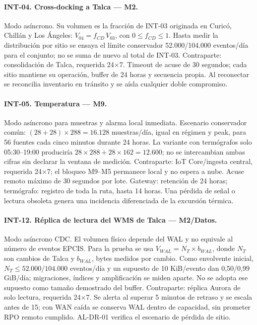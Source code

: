 \paragraph{INT-04. Cross-docking a Talca --- M2.}
Modo asíncrono. Su volumen es la fracción de INT-03 originada en Curicó, Chillán y Los Ángeles: $V_{04}=f_{CD}\,V_{03}$, con $0\leq f_{CD}\leq1$. Hasta medir la distribución por sitio se ensaya el límite conservador 52.000/104.000 eventos/día para el conjunto; no se suma de nuevo al total de INT-03. Contraparte: consolidación de Talca, requerida 24$\times$7. Timeout de acuse de 30 segundos; cada sitio mantiene su operación, buffer de 24 horas y secuencia propia. Al reconectar se reconcilia inventario en tránsito y se aísla cualquier doble compromiso.

\paragraph{INT-05. Temperatura --- M9.}
Modo asíncrono para muestras y alarma local inmediata. Escenario conservador común: $(28+28)\times288=16.128$ muestras/día, igual en régimen y peak, para 56 fuentes cada cinco minutos durante 24 horas. La variante con termógrafos solo 05:30--19:00 produciría $28\times288+28\times162=12.600$; no se intercambian ambas cifras sin declarar la ventana de medición. Contraparte: IoT Core/ingesta central, requerida 24$\times$7; el bloqueo M9--M5 permanece local y no espera a nube. Acuse remoto máximo de 30 segundos por lote. Gateway: retención de 24 horas; termógrafo: registro de toda la ruta, hasta 14 horas. Una pérdida de señal o lectura obsoleta genera una incidencia diferenciada de la excursión térmica.

\paragraph{INT-12. Réplica de lectura del WMS de Talca --- M2/Datos.}
Modo asíncrono CDC. El volumen físico depende del WAL y no equivale al número de eventos EPCIS. Para la prueba se usa $V_{WAL}=N_T\times b_{WAL}$, donde $N_T$ son cambios de Talca y $b_{WAL}$, bytes medidos por cambio. Como envolvente inicial, $N_T\leq52.000/104.000$ eventos/día y un supuesto de 10 KiB/evento dan 0,50/0,99 GiB/día; migraciones, índices y amplificación se miden aparte. No se adopta ese supuesto como tamaño demostrado del buffer. Contraparte: réplica Aurora de solo lectura, requerida 24$\times$7. Se alerta al superar 5 minutos de retraso y se escala antes de 15; con WAN caída se conserva WAL dentro de capacidad, sin prometer RPO remoto cumplido. AL-DR-01 verifica el escenario de pérdida de sitio.

